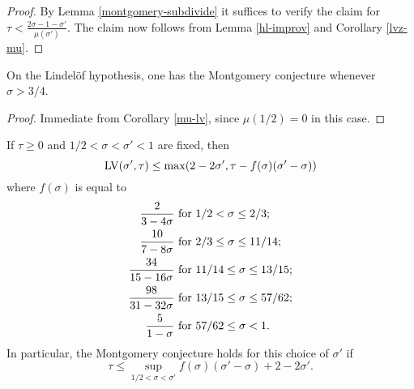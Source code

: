 \begin{proof} By Lemma \ref{montgomery-subdivide} it suffices to verify the claim for $\tau < \frac{2\sigma-1-\sigma'}{\mu(\sigma')}$.  The claim now follows from Lemma \ref{hl-improv} and Corollary \ref{lvz-mu}.
\end{proof}


\begin{theorem}\label{htlv}\cite[Theorem 1]{halasz_distribution_1969} On the Lindel\"of hypothesis, one has the Montgomery conjecture whenever $\sigma > 3/4$.
\end{theorem}

\begin{proof}  Immediate from Corollary \ref{mu-lv}, since $\mu(1/2)=0$ in this case.
\end{proof}

\begin{theorem}\label{ivic-lvt-82}\cite[Lemma 8.2]{ivic}  If $\tau \geq 0$ and $1/2 < \sigma < \sigma' < 1$ are fixed, then
    $$ \mathrm{LV}(\sigma', \tau) \leq \max( 2 - 2\sigma', \tau - f(\sigma) (\sigma'-\sigma) )$$
    where $f(\sigma)$ is equal to
    \begin{align*}
        \frac{2}{3-4\sigma}    & \hbox{ for } 1/2 < \sigma \leq 2/3;        \\
        \frac{10}{7-8\sigma}   & \hbox{ for } 2/3 \leq \sigma \leq 11/14;   \\
        \frac{34}{15-16\sigma} & \hbox{ for } 11/14 \leq \sigma \leq 13/15; \\
        \frac{98}{31-32\sigma} & \hbox{ for } 13/15 \leq \sigma \leq 57/62; \\
        \frac{5}{1-\sigma}     & \hbox{ for } 57/62 \leq \sigma < 1.
    \end{align*}
    In particular, the Montgomery conjecture holds for this choice of $\sigma'$ if
    $$ \tau \leq \sup_{1/2 < \sigma < \sigma'} f(\sigma) (\sigma'-\sigma) + 2 - 2 \sigma'.$$
\end{theorem}

